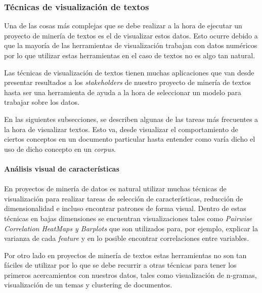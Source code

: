 \subsubsection{Técnicas de visualización de textos}
    Una de las cosas más complejas que se debe realizar a la hora de ejecutar un proyecto de minería de textos es el de visualizar estos datos. Esto ocurre debido a que la mayoría de las herramientas de visualización trabajan con datos numéricos por lo que utilizar estas herramientas en el caso de textos no es algo tan natural. 
    
    Las técnicas de visualización de textos tienen muchas aplicaciones que van desde presentar resultados a los \textit{stakeholders} de nuestro proyecto de minería de textos hasta ser una herramienta de ayuda a la hora de seleccionar un modelo para trabajar sobre los datos.
    
    En las siguientes subsecciones, se describen algunas de las tareas más frecuentes a la hora de visualizar textos. Esto va, desde visualizar el comportamiento de ciertos conceptos en un documento particular hasta entender como varía dicho el uso de dicho concepto en un \textit{corpus}.

\paragraph{Análisis visual de características}
\paragraph*{}
    En proyectos de minería de datos es natural utilizar muchas técnicas de visualización para realizar tareas de selección de características, reducción de dimensionalidad e incluso encontrar patrones de forma visual. Dentro de estas técnicas en bajas dimensiones se encuentran visualizaciones tales como \emph{Pairwise Correlation HeatMaps y Barplots} que son utilizados para, por ejemplo, explicar la varianza de cada \textit{feature} y en lo posible encontrar correlaciones entre variables.
    
    Por otro lado en proyectos de minería de textos estas herramientas no son tan fáciles de utilizar por lo que se debe recurrir a otras técnicas para tener los primeros acercamientos con nuestros datos, tales como visualización de n-gramas, visualización de un temas y clustering de documentos.
    
